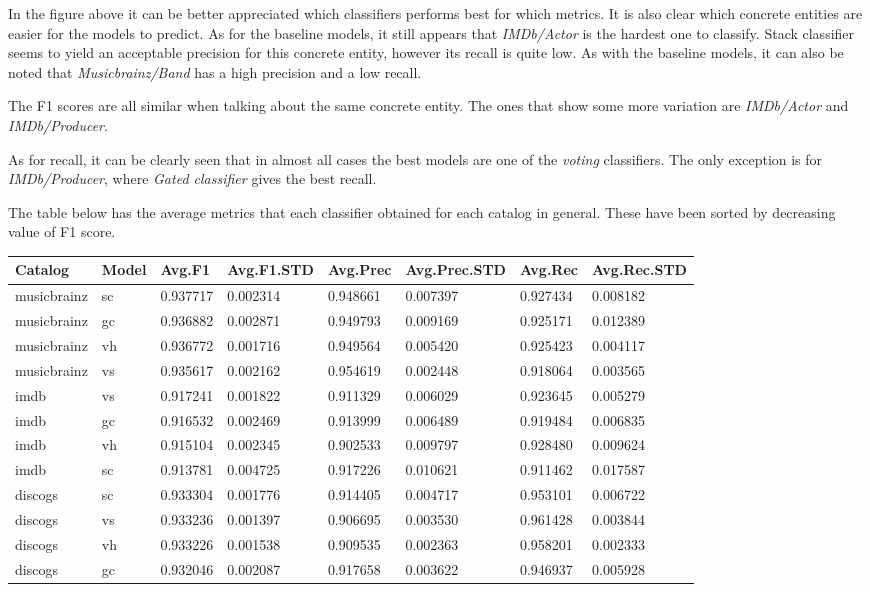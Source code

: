 \documentclass[epsfig,a4paper,11pt,titlepage,twoside,openany]{book}
\begin{document}
In the figure above it can be better appreciated which classifiers performs best for which metrics. It is also clear which concrete entities are easier for the models to predict. As for the baseline models, it still appears that \textit{IMDb/Actor} is the hardest one to classify. Stack classifier seems to yield an acceptable precision for this concrete entity, however its recall is quite low. As with the baseline models, it can also be noted that \textit{Musicbrainz/Band} has a high precision and a low recall.  

The F1 scores are all similar when talking about the same concrete entity. The ones that show some more variation are \textit{IMDb/Actor} and \textit{IMDb/Producer}. 

As for recall, it can be clearly seen that in almost all cases the best models are one of the \textit{voting} classifiers. The only exception is for \textit{IMDb/Producer}, where \textit{Gated classifier} gives the best recall.

The table below has the average metrics that each classifier obtained for each catalog in general. These have been sorted by decreasing value of F1 score.

\begin{longtable}{|l|l|l|l|l|l|l|l|}
\hline
Catalog     & Model & Avg.F1   & Avg.F1.STD & Avg.Prec & Avg.Prec.STD & Avg.Rec  & Avg.Rec.STD \\ \hline
musicbrainz & sc    & 0.937717 & 0.002314   & 0.948661 & 0.007397     & 0.927434 & 0.008182    \\
musicbrainz & gc    & 0.936882 & 0.002871   & 0.949793 & 0.009169     & 0.925171 & 0.012389    \\
musicbrainz & vh    & 0.936772 & 0.001716   & 0.949564 & 0.005420     & 0.925423 & 0.004117    \\
musicbrainz & vs    & 0.935617 & 0.002162   & 0.954619 & 0.002448     & 0.918064 & 0.003565    \\ \hline
imdb        & vs    & 0.917241 & 0.001822   & 0.911329 & 0.006029     & 0.923645 & 0.005279    \\
imdb        & gc    & 0.916532 & 0.002469   & 0.913999 & 0.006489     & 0.919484 & 0.006835    \\
imdb        & vh    & 0.915104 & 0.002345   & 0.902533 & 0.009797     & 0.928480 & 0.009624    \\
imdb        & sc    & 0.913781 & 0.004725   & 0.917226 & 0.010621     & 0.911462 & 0.017587    \\ \hline
discogs     & sc    & 0.933304 & 0.001776   & 0.914405 & 0.004717     & 0.953101 & 0.006722    \\
discogs     & vs    & 0.933236 & 0.001397   & 0.906695 & 0.003530     & 0.961428 & 0.003844    \\
discogs     & vh    & 0.933226 & 0.001538   & 0.909535 & 0.002363     & 0.958201 & 0.002333    \\
discogs     & gc    & 0.932046 & 0.002087   & 0.917658 & 0.003622     & 0.946937 & 0.005928    \\ \hline
\end{longtable}
\end{document}
